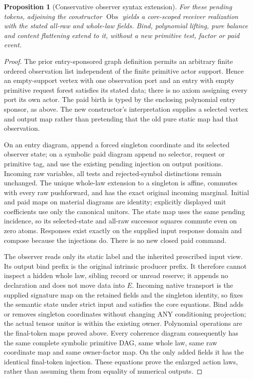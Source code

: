 \documentclass{article}
\newtheorem{proposition}{Proposition}
\begin{document}
\begin{proposition}[Conservative observer syntax extension]
For these pending tokens, adjoining the constructor $\operatorname{Obs}$ yields a core-scoped receiver realization with the stated all-raw and whole-law fields. Bind, polynomial lifting, pure balance and content flattening extend to it, without a new primitive test, factor or paid event.
\end{proposition}
\begin{proof}
The prior entry-sponsored graph definition permits an arbitrary finite ordered observation list independent of the finite primitive actor support. Hence an empty-support vertex with one observation port and an entry with empty primitive request forest satisfies its stated data; there is no axiom assigning every port its own actor. The paid birth is typed by the enclosing polynomial entry sponsor, as above. The new constructor's interpretation supplies a selected vertex and output map rather than pretending that the old pure static map had that observation.

On an entry diagram, append a forced singleton coordinate and its selected observer state; on a symbolic paid diagram append no selector, request or primitive tag, and use the existing pending injection on output positions. Incoming raw variables, all tests and rejected-symbol distinctions remain unchanged. The unique whole-law extension to a singleton is affine, commutes with every raw pushforward, and has the exact original incoming marginal. Initial and paid maps on material diagrams are identity; explicitly displayed unit coefficients use only the canonical unitors. The state map uses the same pending incidence, so its selected-state and all-raw successor squares commute even on zero atoms. Responses exist exactly on the supplied input response domain and compose because the injections do. There is no new closed paid command.

The observer reads only its static label and the inherited prescribed input view. Its output bind prefix is the original intrinsic producer prefix. It therefore cannot inspect a hidden whole law, sibling record or unread reserve; it appends no declaration and does not move data into $E$. Incoming native transport is the supplied signature map on the retained fields and the singleton identity, so fixes the semantic state under strict input and satisfies the core equations. Bind adds or removes singleton coordinates without changing ANY conditioning projection; the actual tensor unitor is within the existing owner. Polynomial operations are the final-token maps proved above. Every coherence diagram consequently has the same complete symbolic primitive DAG, same whole law, same raw coordinate map and same owner-factor map. On the only added fields it has the identical final-token injection. These equations prove the enlarged action laws, rather than assuming them from equality of numerical outputs.
\end{proof}
\end{document}
